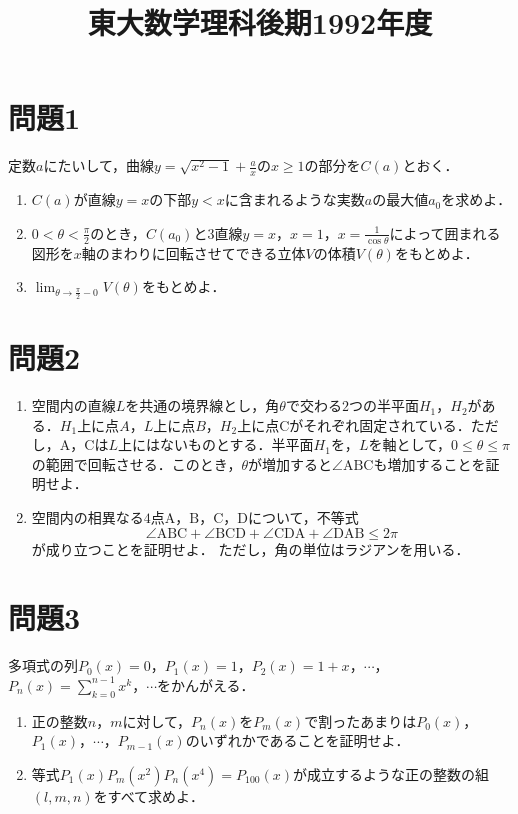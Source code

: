 \documentclass[unicode,12pt, A4j]{ltjsarticle}%
\title{東大数学理科後期1992年度}
\author{}
\date{}
\begin{document}
\maketitle

\section{問題1}
定数$a$にたいして，曲線$y=\sqrt{x^2-1}+\frac{a}{x}$の$x\ge 1$の部分を$C(a)$とおく．

\begin{enumerate}
 \item $C(a)$が直線$y=x$の下部$y<x$に含まれるような実数$a$の最大値$a_0$を求めよ．
 \item $0<\theta<\frac{\pi}{2}$のとき，$C(a_0)$と$3$直線$y=x$，$x=1$，$x=\frac{1}{\cos\theta}$によって囲まれる図形を$x$軸のまわりに回転させてできる立体$V$の体積$V(\theta)$をもとめよ．
 \item $\lim_{\theta\to\frac{\pi}{2}-0}V(\theta)$をもとめよ．
\end{enumerate}

\section{問題2}
\begin{enumerate}
 \item 空間内の直線$L$を共通の境界線とし，角$\theta$で交わる$2$つの半平面$H_1$，$H_2$がある．$H_1$上に点$A$，$L$上に点$B$，$H_2$上に点$\mathrm{C}$がそれぞれ固定されている．ただし，$\mathrm{A}$，$\mathrm{C}$は$L$上にはないものとする．半平面$H_1$を，$L$を軸として，$0\le\theta\le\pi$の範囲で回転させる．このとき，$\theta$が増加すると$\angle \mathrm{ABC}$も増加することを証明せよ．
 \item 空間内の相異なる$4$点$\mathrm{A}$，$\mathrm{B}$，$\mathrm{C}$，$\mathrm{D}$について，不等式
       \begin{equation}
	  \angle \mathrm{ABC}+\angle \mathrm{BCD}+\angle \mathrm{CDA}+\angle \mathrm{DAB} \le 2\pi
       \end{equation}
       が成り立つことを証明せよ．
       ただし，角の単位はラジアンを用いる．
\end{enumerate}


\section{問題3}
多項式の列$P_0(x)=0$，$P_1(x)=1$，$P_2(x)=1+x$，$\cdots$，$P_n(x)=\sum_{k=0}^{n-1}x^k$，$\cdots$をかんがえる．
\begin{enumerate}
 \item 正の整数$n$，$m$に対して，$P_n(x)$を$P_m(x)$で割ったあまりは$P_0(x)$，$P_1(x)$，$\cdots$，$P_{m-1}(x)$のいずれかであることを証明せよ．
 \item 等式$P_1(x)P_m(x^2)P_n(x^4)=P_{100}(x)$が成立するような正の整数の組$(l,m,n)$をすべて求めよ．
\end{enumerate}
\end{document}
